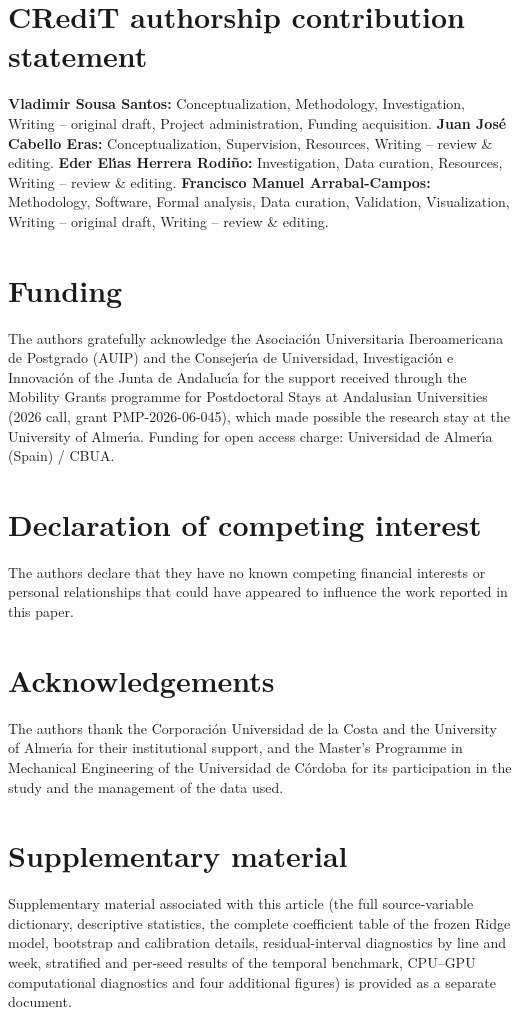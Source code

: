 \section*{CRediT authorship contribution statement}
\textbf{Vladimir Sousa Santos:} Conceptualization, Methodology, Investigation, Writing -- original draft, Project administration, Funding acquisition.
\textbf{Juan Jos\'e Cabello Eras:} Conceptualization, Supervision, Resources, Writing -- review \& editing.
\textbf{Eder El\'{\i}as Herrera Rodi\~no:} Investigation, Data curation, Resources, Writing -- review \& editing.
\textbf{Francisco Manuel Arrabal-Campos:} Methodology, Software, Formal analysis, Data curation, Validation, Visualization, Writing -- original draft, Writing -- review \& editing.

\section*{Funding}
The authors gratefully acknowledge the Asociaci\'on Universitaria Iberoamericana de Postgrado (AUIP) and the Consejer\'{\i}a de Universidad, Investigaci\'on e Innovaci\'on of the Junta de Andaluc\'{\i}a for the support received through the Mobility Grants programme for Postdoctoral Stays at Andalusian Universities (2026 call, grant PMP-2026-06-045), which made possible the research stay at the University of Almer\'{\i}a. Funding for open access charge: Universidad de Almer\'{\i}a (Spain) / CBUA.

\section*{Declaration of competing interest}
The authors declare that they have no known competing financial interests or personal relationships that could have appeared to influence the work reported in this paper.

\section*{Acknowledgements}
The authors thank the Corporaci\'on Universidad de la Costa and the University of Almer\'{\i}a for their institutional support, and the Master's Programme in Mechanical Engineering of the Universidad de C\'ordoba for its participation in the study and the management of the data used.

\section*{Supplementary material}
Supplementary material associated with this article (the full source-variable dictionary, descriptive statistics, the complete coefficient table of the frozen Ridge model, bootstrap and calibration details, residual-interval diagnostics by line and week, stratified and per-seed results of the temporal benchmark, CPU--GPU computational diagnostics and four additional figures) is provided as a separate document.

